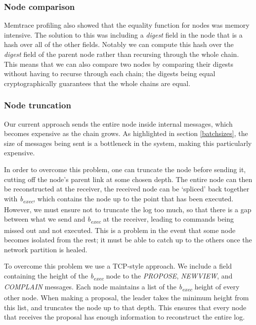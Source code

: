 \subsubsection{Node comparison}
Memtrace profiling also showed that the equality function for nodes was memory intensive. The solution to this was including a \textit{digest} field in the node that is a hash over all of the other fields. Notably we can compute this hash over the \textit{digest} field of the parent node rather than recursing through the whole chain. This means that we can also compare two nodes by comparing their digests without having to recurse through each chain; the digests being equal cryptographically guarantees that the whole chains are equal.

\subsubsection{Node truncation}
Our current approach sends the entire node inside internal messages, which becomes expensive as the chain grows. As highlighted in section \ref{batchsizes}, the size of messages being sent is a bottleneck in the system, making this particularly expensive.

In order to overcome this problem, one can truncate the node before sending it, cutting off the node's parent link at some chosen depth. The entire node can then be reconstructed at the receiver, the received node can be `spliced' back together with \textit{b\textsubscript{exec}}, which contains the node up to the point that has been executed. However, we must ensure not to truncate the log too much, so that there is a gap between what we send and \textit{b\textsubscript{exec}} at the receiver, leading to commands being missed out and not executed. This is a problem in the event that some node becomes isolated from the rest; it must be able to catch up to the others once the network partition is healed.

To overcome this problem we use a TCP-style approach. We include a field containing the height of the \textit{b\textsubscript{exec}} node to the \textit{PROPOSE}, \textit{NEW{\large V}IEW}, and \textit{COMPLAIN} messages. Each node maintains a list of the \textit{b\textsubscript{exec}} height of every other node. When making a proposal, the leader takes the minimum height from this list, and truncates the node up to that depth. This ensures that every node that receives the proposal has enough information to reconstruct the entire log.

